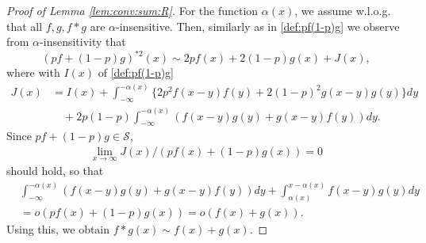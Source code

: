 \documentclass[12pt,leqno]{amsart}
\newcommand{\cals}{{\mathcal S}}
\newcommand{\1}{{\mathbf 1}}
\begin{document}
\begin{proof}[Proof of Lemma \ref{lem:conv:sum:R}]
For the function $\alpha(x)$, we assume w.l.o.g. that 
all $f,g,f\ast g$ are $\alpha$-insensitive. 
Then, similarly as in \eqref{def:pf(1-p)g} we observe from $\alpha$-insensitivity that 
\[
 (pf+(1-p)g)^{\ast 2}(x)\sim 2pf(x)+2(1-p)g(x)+ J(x),
\]
where with $I(x)$ of \eqref{def:pf(1-p)g} 
\begin{align*}
J(x) %
&= I(x) + \int_{-\infty}^{-\alpha(x)} \{ 2p^2 f(x-y)f(y) + 2(1-p)^2 g(x-y)g(y) \}dy \\
&\quad + 2p(1-p) \int_{-\infty}^{-\alpha(x)} (f(x-y)g(y)+g(x-y)f(y)) dy. 
\end{align*}
Since $pf+(1-p)g\in \cals$, 
\begin{align}
\label{neglidgeble:j}
 \lim_{x\to\infty} J(x)/(p f(x)+(1-p)g(x))=0 
\end{align}
should hold, so that 
\begin{align*}
& \int_{-\infty}^{-\alpha(x)} (f(x-y)g(y)+g(x-y)f(y)) dy + \int_{\alpha(x)}^{x-\alpha(x)} f(x-y)g(y)dy \\
& =o(pf(x)+(1-p)g(x))=o(f(x)+g(x)).
\end{align*}
Using this, we obtain $f\ast g(x)\sim f(x)+g(x)$.


\end{proof}
\end{document}
